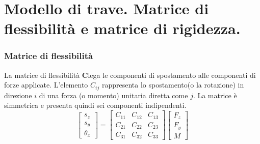 \section{Modello di trave. Matrice di flessibilità e matrice di rigidezza.}

\subsubsection*{Matrice di flessibilità}

\begin{definizioneBox}
    La matrice di flessibilità $\boldsymbol{C} $lega le componenti di spostamento alle componenti di forze applicate. L'elemento $C_{ij} $ rappresenta lo spostamento(o la rotazione) in direzione $i$ di una forza (o momento) unitaria diretta come $j$. La matrice è simmetrica e presenta quindi sei componenti  indipendenti.
    \begin{equation*}
    \begin{bmatrix}
s_z \\
s_y \\
\theta_x
\end{bmatrix}
=
\begin{bmatrix}
C_{11} & C_{12} & C_{13} \\
C_{21} & C_{22} & C_{23} \\
C_{31} & C_{32} & C_{33}
\end{bmatrix}
\begin{bmatrix}
F_z\\
F_y \\
M
\end{bmatrix}
\end{equation*}
\end{definizioneBox}

